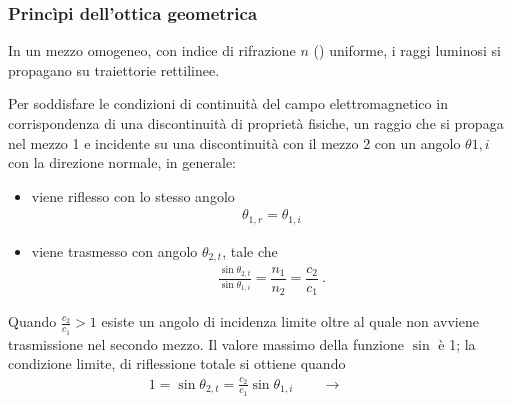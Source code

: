 \documentclass[letterpaper,10pt,italian]{jupyterBook}
\begin{document}
\subsubsection{Princìpi dell’ottica geometrica}
\label{\detokenize{ch/waves/intro:principi-dell-ottica-geometrica}}\label{\detokenize{ch/waves/intro:physics-hs-waves-optics-geometric-principles}}
\sphinxAtStartPar
{} In un mezzo omogeneo, con indice di rifrazione \(n\) ({\hyperref[\detokenize{ch/waves/intro:refraction-index}]{}}) uniforme, i raggi luminosi si propagano su traiettorie rettilinee.

\sphinxAtStartPar
{} Per soddisfare le condizioni di continuità del campo elettromagnetico in corrispondenza di una discontinuità di proprietà fisiche, un raggio che si propaga nel mezzo 1 e incidente su una discontinuità con il mezzo 2 con un angolo \(\theta{1,i}\) con la direzione normale, in generale:
\begin{itemize}
\item {} 
\sphinxAtStartPar
viene riflesso con lo stesso angolo
\begin{equation*}
\begin{split}\theta_{1,r} = \theta_{1,i}\end{split}
\end{equation*}
\item {} 
\sphinxAtStartPar
viene trasmesso con angolo \(\theta_{2,t}\), tale che
\begin{equation*}
\begin{split}\frac{\sin \theta_{2,t}}{\sin \theta_{1,i}} = \dfrac{n_1}{n_2} = \dfrac{c_2}{c_1} \ .\end{split}
\end{equation*}
\end{itemize}

\sphinxAtStartPar
{} 

\sphinxAtStartPar
{} Quando \(\frac{c_2}{c_1} > 1\) esiste un angolo di incidenza limite oltre al quale non avviene trasmissione nel secondo mezzo. Il valore massimo della funzione \(\sin\) è 1; la condizione limite, di riflessione totale si ottiene quando
\begin{equation*}
\begin{split}1 = \sin \theta_{2,t} = \frac{c_2}{c_1} \sin \theta_{1,i} \qquad \rightarrow \qquad \end{split}
\end{equation*}
\end{document}

